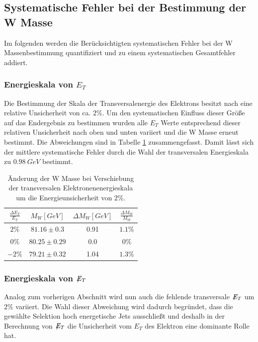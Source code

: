 \documentclass[a4paper,12pt]{article}
\newcommand{\met}{\ensuremath{\not\mathrel{E}}_T}
\begin{document}
\subsection{Systematische Fehler bei der Bestimmung der W Masse}
\label{sysunc}
Im folgenden werden die Berücksichtigten systematischen Fehler bei der W Massenbestimmung quantifiziert und zu einem systematischen Gesamtfehler
addiert.
\subsubsection*{Energieskala von $E_{T}$}
Die Bestimmung der Skala der Transversalenergie des Elektrons besitzt nach \cite{Abachi:1996ey} eine relative Unsicherheit von ca. $2\%$. Um den systematischen Einfluss
dieser Größe auf das Endergebnis zu bestimmen wurden alle $E_{T}$ Werte entsprechend dieser relativen Unsicherheit nach oben und unten variiert und die
W Masse erneut bestimmt. Die Abweichungen sind in Tabelle \ref{tab:syset} zusammengefasst. Damit lässt sich der mittlere systematische Fehler durch die
Wahl der transversalen Energieskala zu $\SI{0.98}{GeV}$ bestimmt.
\begin{table}[h]
	\centering
	\begin{tabular}{c| c c c}
		$\frac{\Delta E_{T}}{E_{T}}$ & $M_{W} [\si{GeV}]$ & $\Delta M_{W}[GeV]$ &$\frac{\Delta M_{W}}{M_{W}}$\\
		\hline
		$2\%$ & $81.16\pm 0.3$ & 0.91 & $1.1\%$\\
		$0\%$ & $80.25\pm 0.29$ & 0.0 & $0\%$ \\
		$-2\%$ & $79.21\pm 0.32$ & 1.04 &$1.3\%$
	\end{tabular}
	\caption{Änderung der W Masse bei Verschiebung der transversalen Elektronenenergieskala um die
	Energieunsicherheit von $2\%$.}
	\label{tab:syset}
\end{table}
\subsubsection*{Energieskala von $\met$}
Analog zum vorherigen Abschnitt wird nun auch die fehlende transversale $\met$ um $2\%$  variiert. Die Wahl dieser Abweichung wird dadurch begründet, dass
die gewählte Selektion hoch energetische Jets ausschließt und deshalb in der Berechnung von $\met$ die Unsicherheit
vom $E_T$ des Elektron eine dominante Rolle hat.
\end{document}
